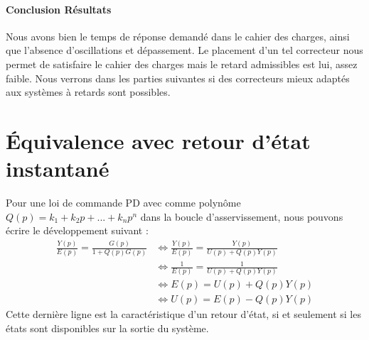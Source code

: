 \paragraph*{Conclusion Résultats} Nous avons bien le temps de réponse demandé dans le cahier des charges, ainsi que l'absence d'oscillations et dépassement. Le placement d'un tel correcteur nous permet de satisfaire le cahier des charges mais le retard admissibles est lui, assez faible. Nous verrons dans les parties suivantes si des correcteurs mieux adaptés aux systèmes à retards sont possibles.


\section{Équivalence avec retour d'état instantané}
Pour une loi de commande PD avec comme polynôme $Q(p) = k_1+k_2p+...+k_np^n$ dans la boucle d'asservissement, nous pouvons écrire le développement suivant : 
\begin{align*}
\frac{Y(p)}{E(p)} = \frac{G(p)}{1 + Q(p)G(p)} & \Leftrightarrow \frac{Y(p)}{E(p)} = \frac{Y(p)}{U(p) + Q(p)Y(p)}\\
&\Leftrightarrow \frac{1}{E(p)} = \frac{1}{U(p) + Q(p)Y(p)} \\
& \Leftrightarrow E(p) = U(p) + Q(p)Y(p)\\
& \Leftrightarrow U(p) = E(p) - Q(p)Y(p)
\end{align*} 
Cette dernière ligne est la caractéristique d'un retour d'état, si et seulement si les états sont disponibles sur la sortie du système.